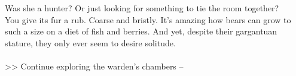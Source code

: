 Was she a hunter? Or just looking for something to tie the room together?\\

You give its fur a rub. Coarse and bristly. It’s amazing how bears can grow to such a size on a diet of fish and berries. And yet, despite their gargantuan stature, they only ever seem to desire solitude.\\
\\

>> Continue exploring the warden’s chambers -- 